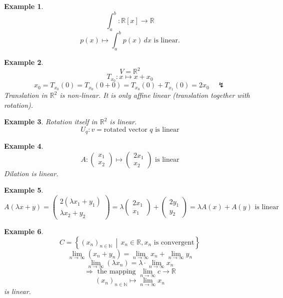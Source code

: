 \documentclass[a4paper,landscape,twocolumn]{article}
\newcommand\setdef[2]{\left\{#1\,\middle|\,#2\right\}}
\newtheorem{ex}{Example}
\begin{document}
\begin{ex}
  \[ \int_a^b: \mathbb R[x] \rightarrow \mathbb R \]
  \[ p(x) \mapsto \int_a^b p(x) \,dx \text{ is linear.} \]
\end{ex}

\begin{ex}
  \[ V = \mathbb R^2 \]
  \[ T_{x_0}: x \mapsto x + x_0 \]
  \[ x_0 = T_{x_0}(0) = T_{x_0}(0 + 0) = T_{x_0}(0) + T_{x_1}(0) = 2 x_0 \quad\lightning \]
  Translation in $\mathbb R^2$ is non-linear.
  It is only \emph{affine linear} (translation together with rotation).
\end{ex}

\begin{ex}
  Rotation itself in $\mathbb R^2$ is linear.
  \[ U_q: v = \text{rotated vector $q$ is linear} \]
\end{ex}

\begin{ex}
  \[
    A: \begin{pmatrix} x_1 \\ x_2 \end{pmatrix} \mapsto \begin{pmatrix} 2x_1 \\ x_2 \end{pmatrix}
    \text{ is linear}
  \]
  Dilation is linear.
\end{ex}

\begin{ex}
  \[
    A(\lambda x + y)
    = \begin{pmatrix} 2 (\lambda x_1 + y_1) \\ \lambda x_2 + y_2 \end{pmatrix}
    = \lambda \begin{pmatrix} 2 x_1 \\ x_1 \end{pmatrix} + \begin{pmatrix} 2 y_1 \\ y_2 \end{pmatrix}
    = \lambda A(x) + A(y)
    \text{ is linear}
  \]
\end{ex}

\begin{ex}
  \[ C = \setdef{(x_n)_{n\in\mathbb N}}{x_n \in \mathbb R, x_n \text{ is convergent}} \]
  \[ \lim_{n\to\infty} (x_n + y_n) = \lim_{n\to\infty} x_n + \lim_{n\to\infty} y_n \]
  \[ \lim_{n\to\infty} (\lambda x_n) = \lambda \cdot \lim_{n\to\infty} x_n \]
  \[ \Rightarrow \text{ the mapping } \lim_{n\to\infty} c \rightarrow \mathbb R \]
  \[ (x_n)_{n\in\mathbb N} \mapsto \lim_{n\to\infty} x_n\]
  is linear.
\end{ex}
\end{document}
